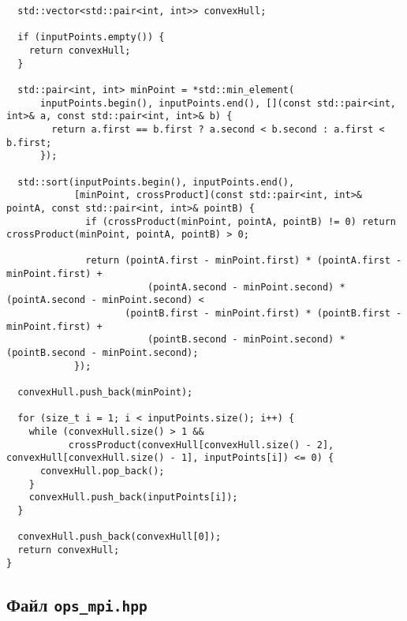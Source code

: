 \documentclass[12pt]{article}
\begin{document}
\begin{verbatim}
  std::vector<std::pair<int, int>> convexHull;

  if (inputPoints.empty()) {
    return convexHull;
  }

  std::pair<int, int> minPoint = *std::min_element(
      inputPoints.begin(), inputPoints.end(), [](const std::pair<int, int>& a, const std::pair<int, int>& b) {
        return a.first == b.first ? a.second < b.second : a.first < b.first;
      });

  std::sort(inputPoints.begin(), inputPoints.end(),
            [minPoint, crossProduct](const std::pair<int, int>& pointA, const std::pair<int, int>& pointB) {
              if (crossProduct(minPoint, pointA, pointB) != 0) return crossProduct(minPoint, pointA, pointB) > 0;

              return (pointA.first - minPoint.first) * (pointA.first - minPoint.first) +
                         (pointA.second - minPoint.second) * (pointA.second - minPoint.second) <
                     (pointB.first - minPoint.first) * (pointB.first - minPoint.first) +
                         (pointB.second - minPoint.second) * (pointB.second - minPoint.second);
            });

  convexHull.push_back(minPoint);

  for (size_t i = 1; i < inputPoints.size(); i++) {
    while (convexHull.size() > 1 &&
           crossProduct(convexHull[convexHull.size() - 2], convexHull[convexHull.size() - 1], inputPoints[i]) <= 0) {
      convexHull.pop_back();
    }
    convexHull.push_back(inputPoints[i]);
  }

  convexHull.push_back(convexHull[0]);
  return convexHull;
}
\end{verbatim}
\subsection*{Файл \texttt{ops\_mpi.hpp}}
\end{document}
